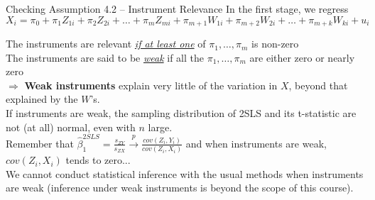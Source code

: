 \documentclass[notes,10pt, aspectratio=169]{beamer}
\begin{document}
\begin{frame}{Checking Assumption 4.2 -- Instrument Relevance}
In the first stage, we regress
\begin{equation*}
    X_i = \pi_0 + \pi_1 Z_{1i}+ \pi_2 Z_{2i} + \dots + \pi_m Z_{mi} + \pi_{m+1} W_{1i} + \pi_{m+2} W_{2i} + \dots + \pi_{m+k} W_{ki} +u_i
\end{equation*}

The instruments are relevant \underline{\textit{if at least one}} of $\pi_1, \dots, \pi_m$ is non-zero\\

The instruments are said to be \underline{\textit{weak}} if all the $\pi_1, \dots, \pi_m$ are either zero or nearly zero\\[1em]

$\Rightarrow$ \textbf{Weak instruments} explain very little of the variation in $X$, beyond that explained by the $W$’s.\\[1em]

If instruments are weak, the sampling distribution of 2SLS and its t-statistic are not (at all) normal, even with $n$ large.\\[1em]

Remember that $\hat{\beta}_1^{2SLS}= \frac{s_{ZY}}{s_{ZX}} \overset{p}{\to}  \frac{cov(Z_i, Y_i)}{cov(Z_i, X_i)}$ and when instruments are weak, $cov(Z_i, X_i)$ tends to zero...\\[1em]

We cannot conduct statistical inference with the usual methods when instruments are weak (inference under weak instruments is beyond the scope of this course).

\end{frame}
\end{document}
